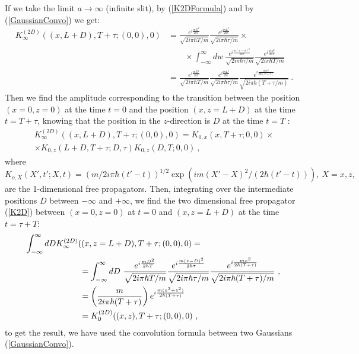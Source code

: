 \documentclass[12pt]{article}   %
\begin{document}
If we take the limit $a\rightarrow\infty$ (infinite slit), 
by (\ref{K2DFormula}) and by (\ref{GaussianConvo}) we get:
\begin{align*}
K_{\infty}^{(2D)}((x,L+D),T+\tau;(0,0),0)&=\frac{e^{i\frac{mD^2}{2\hbar T}}}{\sqrt{2i\pi\hbar T/m}} 
\frac{e^{i\frac{m L^2}{2\hbar\tau}}}{\sqrt{2i\pi\hbar\tau/m}}\times \\
& \qquad \times \int_{-\infty}^{\infty}dw\ \frac{e^{i\frac{m (x-w)^2}{2\hbar\tau}}}{\sqrt{2i\pi\hbar\tau/m}}
\frac{e^{i\frac{m w^2}{2\hbar T}}}{\sqrt{2i\pi\hbar T/m}}
{}\\{}&=\frac{e^{i\frac{mD^2}{2\hbar T}}}{\sqrt{2i\pi\hbar T/m}} 
\frac{e^{i\frac{m L^2}{2\hbar\tau}}}{\sqrt{2i\pi\hbar\tau/m}}
\frac{e^{i\frac{m x^2}{2\hbar (T+\tau)}}}{\sqrt{2i\pi\hbar (T+\tau/m)}}\ .
\end{align*}
Then we find the amplitude corresponding to the transition
between the position $(x=0,z=0)$ at the time $t=0$ 
and the position $(x,z=L+D)$ at the time $t=T+\tau$, 
knowing that the position in the $z$-direction is $D$ at the time $t=T$ :
\begin{multline*}
K_{\infty}^{(2D)}((x,L+D),T+\tau; (0,0),0) =K_{0,x}\left(x,T+\tau;0,0\right) \times \\ \times K_{0,z}\left(L+D,T+\tau;D,\tau\right)K_{0,z}\left(D,T;0,0\right)\ ,
\end{multline*}
where $K_{o,X}(X',t';X,t)=(m/2i\pi\hbar(t'-t))^{1/2}\exp{\left(im(X'-X)^2/(2\hbar(t'-t))\right)},\ X=x,z,$ 
are the 1-dimensional free propagators.
Then, integrating over the intermediate positions $D$ between $-\infty$ and $+\infty$,
we find the two dimensional free propagator (\ref{K2D}) between $(x=0,z=0)$ at $t=0$
and $(x,z=L+D)$ at the time $t=\tau+T$:
\begin{align*}
\rlap{$\displaystyle \int_{-\infty}^{\infty}dD {K_{\infty}^{(2D)}((x,z=L+D),T+\tau;(0,0),0)}=$}\phantom{KKKKKKK}&{}\\
&=\int_{-\infty}^{\infty}dD\ \frac{e^{i\frac{mD^2}{2\hbar T}}}{\sqrt{2i\pi\hbar T/m}} 
\frac{e^{i\frac{m (z-D)^2}{2\hbar\tau}}}{\sqrt{2i\pi\hbar\tau/m}}
\frac{e^{i\frac{m x^2}{2\hbar (T+\tau)}}}{\sqrt{2i\pi\hbar (T+\tau)/m}}\ ,
{}\\{}&=\left(\frac{m}{2i\pi\hbar (T+\tau)}\right)e^{i\frac{m (x^2+z^2)}{2\hbar (T+\tau)}}
{}\\{}&= K_0^{(2D)}((x,z),T+\tau;(0,0),0)\ ,
\end{align*} 
to get the result, we have used the convolution formula between two Gaussians (\ref{GaussianConvo}).
\end{document}
